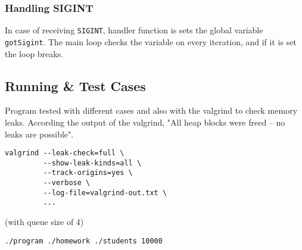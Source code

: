 \documentclass[a4paper]{article}
\begin{document}
\subsubsection*{Handling SIGINT}
\label{sec:org6dac091}
In case of receiving \texttt{SIGINT}, handler function is sets the global variable \texttt{gotSigint}. The main loop checks the  variable on every iteration, and if it is set the loop breaks.

\subsection*{Running \& Test Cases}
\label{sec:org801a065}

Program tested with different cases and also with the valgrind to check memory leaks. According the output of the valgrind, "All heap blocks were freed -- no leaks are possible".

\begin{verbatim}
valgrind --leak-check=full \
         --show-leak-kinds=all \
         --track-origins=yes \
         --verbose \
         --log-file=valgrind-out.txt \
         ...
\end{verbatim}

\newpage

(with queue size of 4)

\begin{verbatim}
./program ./homework ./students 10000
\end{verbatim}
\end{document}
